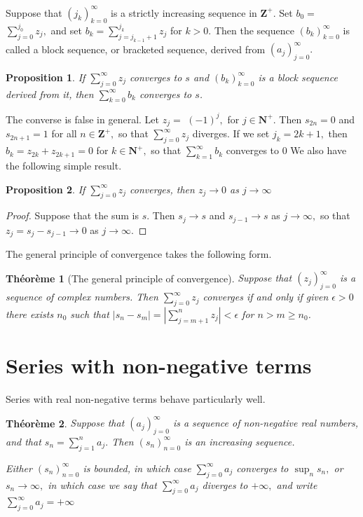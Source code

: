 \documentclass[12pt]{book}
\theoremstyle{definition}\newtheorem{dfn}{Définition}[chapter]
\theoremstyle{plain}\newtheorem{thm}{Théorème}[chapter]
\theoremstyle{plain}\newtheorem{prp}{Proposition}[chapter]
\theoremstyle{plain}\newtheorem{lem}{\bf Lemme}[chapter]
\theoremstyle{plain}\newtheorem{axm}{\bf Axiome}[chapter]
\theoremstyle{plain}\newtheorem{lmm}{\bf Lemme}[chapter]
\theoremstyle{plain}\newtheorem{exm}{\bf Example}[chapter]
\theoremstyle{plain}\newtheorem{cor}{\bf Corollaire}[chapter]
\theoremstyle{remark}\newtheorem{rem}{Remarque}[chapter]
\begin{document}
Suppose that $\left(j_{k}\right)_{k=0}^{\infty}$ is a strictly increasing sequence in $\mathbf{Z}^{+} .$ Set $b_{0}=$ $\sum_{j=0}^{j_{0}} z_{j},$ and set $b_{k}=\sum_{j=j_{k-1}+1}^{j_{k}} z_{j}$ for $k>0 .$ Then the sequence $\left(b_{k}\right)_{k=0}^{\infty}$
is called a block sequence, or bracketed sequence, derived from $\left(a_{j}\right)_{j=0}^{\infty} .$ 
\begin{prp}
If $\sum_{j=0}^{\infty} z_{j}$ converges to $s$ and $\left(b_{k}\right)_{k=0}^{\infty}$ is a block sequence derived from it, then $\sum_{k=0}^{\infty} b_{k}$ converges to $s$.
\end{prp} 
The converse is false in general. Let $z_{j}=$ $(-1)^{j},$ for $j \in \mathbf{N}^{+} .$ Then $s_{2 n}=0$ and $s_{2 n+1}=1$ for all $n \in \mathbf{Z}^{+},$ so that $\sum_{j=0}^{\infty} z_{j}$ diverges. If we set $j_{k}=2 k+1,$ then $b_{k}=z_{2 k}+z_{2 k+1}=0$ for $k \in \mathbf{N}^{+},$ so that $\sum_{k=1}^{\infty} b_{k}$ converges to 0 We also have the following simple result.
\begin{prp}
If $\sum_{j=0}^{\infty} z_{j}$ converges, then $z_{j} \rightarrow 0$ as $j \rightarrow \infty$
\end{prp}
 \begin{proof}
 Suppose that the sum is $s$. Then $s_{j} \rightarrow s$ and $s_{j-1} \rightarrow s$ as $j \rightarrow \infty,$ so that $z_{j}=s_{j}-s_{j-1} \rightarrow 0$ as $j \rightarrow \infty$.
 \end{proof}

The general principle of convergence takes the following form.
\begin{thm}[The general principle of convergence]Suppose that  $\left(z_{j}\right)_{j=0}^{\infty}$ is a sequence of complex numbers. Then $\sum_{j=0}^{\infty} z_{j}$ converges if and only if given $\epsilon>0$ there exists $n_{0}$ such that $\left|s_{n}-s_{m}\right|=\left|\sum_{j=m+1}^{n} z_{j}\right|<\epsilon$ for $n>m \geq n_{0}$.
\end{thm}
\section{Series with non-negative terms}
Series with real non-negative terms behave particularly well.
\begin{thm}
Suppose that $\left(a_{j}\right)_{j=0}^{\infty}$ is a sequence of non-negative real numbers, and that $s_{n}=\sum_{j=1}^{n} a_{j} .$ Then $\left(s_{n}\right)_{n=0}^{\infty}$ is an increasing sequence.

 Either $\left(s_{n}\right)_{n=0}^{\infty}$ is bounded, in which case $\sum_{j=0}^{\infty} a_{j}$ converges to $\sup _{n} s_{n},$ or $s_{n} \rightarrow \infty,$ in which case we say that $\sum_{j=0}^{\infty} a_{j}$ diverges to $+\infty,$ and write $\sum_{j=0}^{\infty} a_{j}=+\infty$
\end{thm} 
\end{document}
